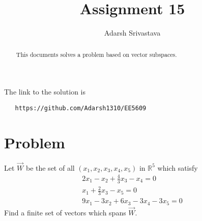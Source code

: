 \documentclass[journal,12pt,twocolumn]{IEEEtran}
\begin{document}
       \def\rightbox#1{\makebox[0in][r]{#1}}
       \def\centbox#1{\makebox[0in]{#1}}
       \def\topbox#1{\raisebox{-\baselineskip}[0in][0in]{#1}}
       \def\midbox#1{\raisebox{-0.5\baselineskip}[0in][0in]{#1}}
  \vspace{3cm}
  \title{Assignment 15}
  \author{Adarsh Srivastava}
  \maketitle
  \newpage
  \bigskip
  \renewcommand{\thetable}{\theenumi}
  The link to the solution is
  \begin{lstlisting}
   https://github.com/Adarsh1310/EE5609
  \end{lstlisting}
  \begin{abstract}
  This documents solves a problem based on vector subspaces.
  \end{abstract}
   \section{\textbf{Problem}}
 Let $\vec{W}$ be the set of all $(x_1,x_2,x_3,x_4,x_5)$ in $\mathbb{R}^5$ which satisfy
 \begin{align*}
 2x_1-x_2+\frac{4}{3}x_3-x_4=0\\x_1+\frac{2}{3}x_3-x_5=0\\9x_1-3x_2+6x_3-3x_4-3x_5=0
 \end{align*}
 Find a finite set of vectors which spans $\vec{W}$.
\end{document}
